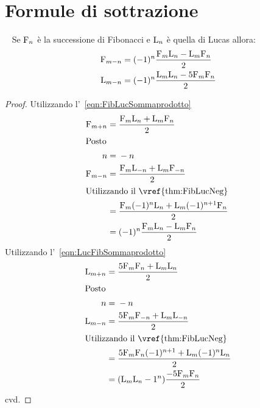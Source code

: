 \section{Formule di sottrazione}
\begin{thm}~\cite{Rabinowitz_1996}\label{thm:FibLucFormSottazione}
	Se $\mathrm{F}_{n}$ è la successione di Fibonacci e  $\mathrm{L}_{n}$ è quella di Lucas 
allora:
\begin{align}
	\mathrm{F}_{m-n}={}&(-1)^n\dfrac{\mathrm{F}_{m}\mathrm{L}_{n}-\mathrm{L}_{m}\mathrm{F}_{n}}{2}\\
	\mathrm{L}_{m-n}={}&(-1)^n\dfrac{\mathrm{L}_{m}\mathrm{L}_{n}-5\mathrm{F}_{m}\mathrm{F}_{n}}{2}
\end{align}
\end{thm}
\begin{proof}
Utilizzando l'~\vref{eqn:FibLucSommaprodotto}
\begin{align*}
	\Fib{m+n}={}&\dfrac{\Fib{m}\Luc{n}+\Luc{m}\Fib{n}}{2}\\
\intertext{Posto}
n={}&-n\\
\Fib{m-n}={}&\dfrac{\Fib{m}\Luc{-n}+\Luc{m}\Fib{-n}}{2}\\
\intertext{Utilizzando il~\vref{thm:FibLucNeg} }
={}&\dfrac{\Fib{m}(-1)^n\Luc{n}+\Luc{m}(-1)^{n+1}\Fib{n}}{2}\\
={}&(-1)^n\dfrac{\Fib{m}\Luc{n}-\Luc{m}\Fib{n}}{2}
\end{align*}
Utilizzando l'~\vref{eqn:LucFibSommaprodotto}
\begin{align*}
\Luc{m+n}={}&\dfrac{5\Fib{m}\Fib{n}+\Luc{m}\Luc{n}}{2}\\
\intertext{Posto}
n={}&-n\\
\Luc{m-n}={}&\dfrac{5\Fib{m}\Fib{-n}+\Luc{m}\Luc{-n}}{2}\\
\intertext{Utilizzando il~\vref{thm:FibLucNeg} }
={}&\dfrac{5\Fib{m}\Fib{n}(-1)^{n+1}+\Luc{m}(-1)^n\Luc{n}}{2}\\
={}&(\Luc{m}\Luc{n}-1^n)\dfrac{-5\Fib{m}\Fib{n}}{2}\\
\end{align*}
cvd.
\end{proof}
